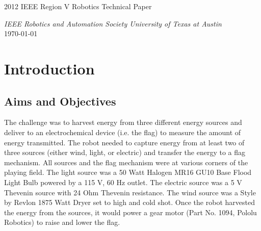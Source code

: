 \documentclass[12pt]{article}
\begin{document}


\begin{center}
{\Huge 2012 IEEE Region V Robotics Technical Paper}\\[\baselineskip]
\end{center}
{\large\itshape IEEE Robotics and Automation Society University of Texas at Austin}\\[\baselineskip]
\today 

\section{Introduction}
\subsection{Aims and Objectives}
The challenge was to harvest energy from three different energy sources and deliver to an electrochemical device (i.e. the flag) to measure the amount of energy transmitted. The robot needed to capture energy from at least two of three sources (either wind, light, or electric) and transfer the energy to a flag mechanism. All sources and the flag mechanism were at various corners of the playing field. The light source was a 50 Watt Halogen MR16 GU10 Base Flood Light Bulb powered by a 115 V, 60 Hz outlet. The electric source was a 5 V Thevenin source with 24 Ohm Thevenin resistance. The wind source was a Style by Revlon 1875 Watt Dryer set to high and cold shot. Once the robot harvested the energy from the sources, it would power a gear motor (Part No. 1094, Pololu Robotics) to raise and lower the flag. 



\end{document}
